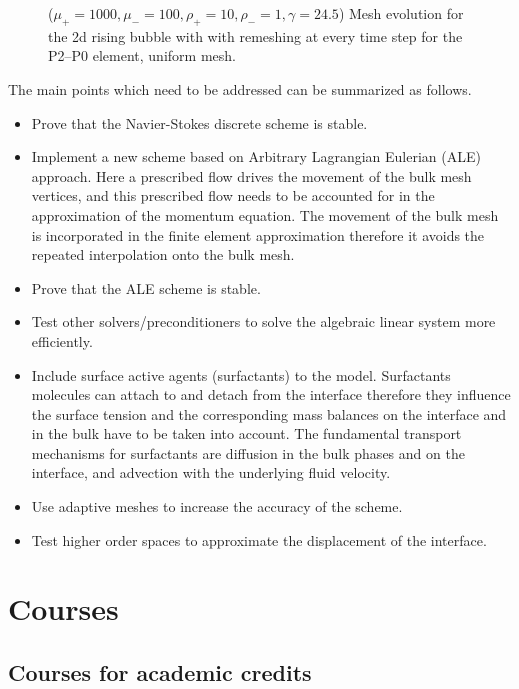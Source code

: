\documentclass[a4paper,11pt,onecolumn]{article}
\begin{document}
\begin{figure}[htbp]
\centering
{}
\caption{($\mu_+ = 1000,\mu_- = 100,\rho_+=10,\rho_-=1,\gamma = 24.5$)
Mesh evolution for the 2d rising bubble with with remeshing at every time step
for the P2--P0 element, uniform mesh.}
\label{fig:rising_bubble_2d}
\end{figure}

The main points which need to be addressed can be summarized as follows.
\begin{itemize}
\item Prove that the Navier-Stokes discrete scheme is stable.
\item Implement a new scheme based on Arbitrary Lagrangian Eulerian (ALE)
approach. Here a prescribed flow drives the movement of the bulk mesh vertices,
and this prescribed flow needs to be accounted for in the approximation of the
momentum equation. The movement of the bulk mesh is incorporated in the finite
element approximation therefore it avoids the repeated interpolation onto the
bulk mesh.
\item Prove that the ALE scheme is stable.
\item Test other solvers/preconditioners to solve the algebraic linear system
more efficiently.
\item Include surface active agents (surfactants) to the model. Surfactants
molecules can attach to and detach from the interface therefore they influence
the surface tension and the corresponding mass balances on the interface and in
the bulk have to be taken into account. The fundamental transport mechanisms for
surfactants are diffusion in the bulk phases and on the interface, and advection
with the underlying fluid velocity.
\item Use adaptive meshes to increase the accuracy of the scheme.
\item Test higher order spaces to approximate the displacement of the interface.
\end{itemize}

\section{Courses}

\subsection{Courses for academic credits}
\end{document}
